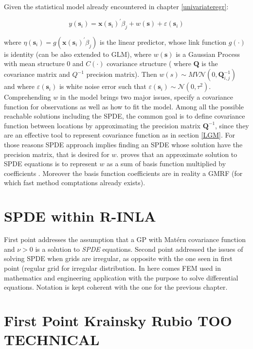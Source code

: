 \documentclass[
  12pt,
  a4paper,
  oneside]{book}
\begin{document}
Given the statistical model already encountered in chapter \ref{univariateregr}:

\[
y\left(\mathbf{s}_{i}\right)=\mathbf{x}\left(\mathbf{s}_{i}\right)^{\prime} \beta_{j}+w(\mathbf{s})+\varepsilon\left(\mathbf{s}_{i}\right)
\]

where \(\eta(\mathbf{s}_{i}) = g (\mathbf{x}\left(\mathbf{s}_{i}\right)^{\prime}\beta_{j})\) is the linear predictor, whose link function \(g( \cdot )\) is identity (can be also extended to GLM), where \(w(\mathbf{s})\) is a Gaussian Process with mean structure 0 and \(C(\cdot)\) covariance structure ( where \(\boldsymbol{Q}\) is the covariance matrix and \(Q^{-1}\) precision matrix). Then \(w(s) \sim MV\mathcal{N}(0, \boldsymbol{Q}_{i,j}^{-1})\) and where \(\varepsilon(\mathbf{s}_{i})\) is white noise error such that \(\varepsilon(\mathbf{s}_{i}) \sim \mathcal{N}\left(0, \tau^{2}\right)\).
Comprehending \(w\) in the model brings two major issues, specify a covariance function for observations as well as how to fit the model. Among all the possible reachable solutions including the SPDE, the common goal is to define covariance function between locations by approximating the precision matrix \(\boldsymbol{Q}^{-1}\), since they are an effective tool to represent covariance function as in section \ref{LGM}.
For those reasons SPDE approach implies finding an SPDE whose solution have the precision matrix, that is desired for \(w\). \citet{Lindgren2011} proves that an approximate solution to SPDE equations is to represent \(w\) as a sum of basis function multiplied by coefficients \citeyearpar{Miller2019}. Moreover the basis function coefficients are in reality a GMRF (for which fast method comptations already exists).

\hypertarget{spde-within-r-inla}{%
\section{SPDE within R-INLA}\label{spde-within-r-inla}}

First point addresses the assumption that a GP with Matérn covariance function and \(\nu >0\) is a solution to \emph{SPDE} equations.
Second point addressed the issues of solving SPDE when grids are irregular, as opposite with the one seen in first point (regular grid for irregular distribution. In here comes FEM used in mathematics and engineering application with the purpose to solve differential equations. Notation is kept coherent with the one for the previous chapter.

\hypertarget{first-point-krainsky-rubio-too-technical}{%
\section{First Point Krainsky Rubio TOO TECHNICAL}\label{first-point-krainsky-rubio-too-technical}}
\end{document}
